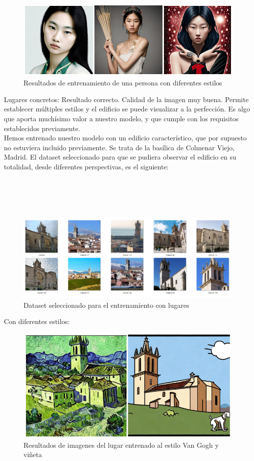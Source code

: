 \begin{figure}[h]
	\centering
	\includegraphics[width = 0.6
	\textwidth]{Imagenes/Vectorial/hoyeon_results.png}
	\caption{Resultados de entrenamiento de una persona con diferentes estilos}
	\label{fig:sampleImage}
\end{figure}
Lugares concretos: Resultado correcto. Calidad de la imagen muy buena. Permite establecer múltiples estilos y el edificio se puede visualizar a la perfección. Es algo que aporta muchísimo valor a nuestro modelo, y que cumple con los requisitos establecidos previamente.\\

Hemos entrenado nuestro modelo con un edificio característico, que por supuesto no estuviera incluido previamente. Se trata de la basílica de Colmenar Viejo, Madrid. El dataset seleccionado para que se pudiera observar el edificio en su totalidad, desde diferentes perspectivas, es el siguiente:\\\\\\\\\\

\begin{figure}[!htb]
	\centering
	\includegraphics[width = 0.7
	\textwidth]{Imagenes/Vectorial/dataset_colmenar.png}
	\caption{Dataset seleccionado para el entrenamiento con lugares}
	\label{fig:sampleImage}
\end{figure}

Con diferentes estilos:\\

\begin{figure}[!htb]
	\centering
	\includegraphics[width = 0.6
	\textwidth]{Imagenes/Vectorial/colmenar_styles.png}
	\caption{Resultados de imagenes del lugar entrenado al estilo Van Gogh y viñeta}
	\label{fig:sampleImage}
\end{figure}


